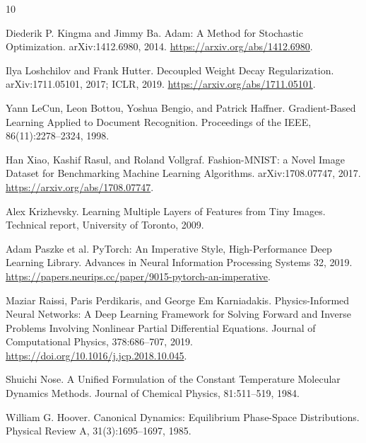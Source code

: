 \documentclass[11pt]{article}
\begin{document}
\begin{thebibliography}{10}

Diederik P. Kingma and Jimmy Ba.
\newblock Adam: A Method for Stochastic Optimization.
\newblock arXiv:1412.6980, 2014.
\newblock \url{https://arxiv.org/abs/1412.6980}.

Ilya Loshchilov and Frank Hutter.
\newblock Decoupled Weight Decay Regularization.
\newblock arXiv:1711.05101, 2017; ICLR, 2019.
\newblock \url{https://arxiv.org/abs/1711.05101}.

Yann LeCun, Leon Bottou, Yoshua Bengio, and Patrick Haffner.
\newblock Gradient-Based Learning Applied to Document Recognition.
\newblock Proceedings of the IEEE, 86(11):2278--2324, 1998.

Han Xiao, Kashif Rasul, and Roland Vollgraf.
\newblock Fashion-MNIST: a Novel Image Dataset for Benchmarking Machine Learning Algorithms.
\newblock arXiv:1708.07747, 2017.
\newblock \url{https://arxiv.org/abs/1708.07747}.

Alex Krizhevsky.
\newblock Learning Multiple Layers of Features from Tiny Images.
\newblock Technical report, University of Toronto, 2009.

Adam Paszke et al.
\newblock PyTorch: An Imperative Style, High-Performance Deep Learning Library.
\newblock Advances in Neural Information Processing Systems 32, 2019.
\newblock \url{https://papers.neurips.cc/paper/9015-pytorch-an-imperative}.

Maziar Raissi, Paris Perdikaris, and George Em Karniadakis.
\newblock Physics-Informed Neural Networks: A Deep Learning Framework for Solving Forward and Inverse Problems Involving Nonlinear Partial Differential Equations.
\newblock Journal of Computational Physics, 378:686--707, 2019.
\newblock \url{https://doi.org/10.1016/j.jcp.2018.10.045}.

Shuichi Nose.
\newblock A Unified Formulation of the Constant Temperature Molecular Dynamics Methods.
\newblock Journal of Chemical Physics, 81:511--519, 1984.

William G. Hoover.
\newblock Canonical Dynamics: Equilibrium Phase-Space Distributions.
\newblock Physical Review A, 31(3):1695--1697, 1985.

\end{thebibliography}
\end{document}
